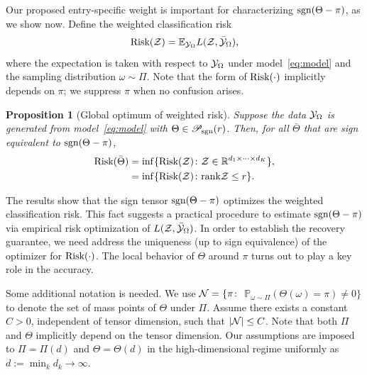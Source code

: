 \documentclass{article}
\theoremstyle{plain}
\newtheorem{prop}{Proposition}
\theoremstyle{definition}
\def\sign{\textup{sgn}}
\def\caliP{\mathscr{P}_{\textup{sgn}}}
\def\risk{\textup{Risk}}
\begin{document}
Our proposed entry-specific weight is important for characterizing $\sign(\Theta-\pi)$, as we show now. Define the weighted classification risk 
\begin{equation}\label{eq:population}
\textup{Risk}(\mathcal{Z})=\mathbb{E}_{\mathcal{Y}_\Omega}L(\mathcal{Z},\bar{\mathcal{Y}}_\Omega),
\end{equation}
where the expectation is taken with respect to $\mathcal{Y}_\Omega$ under model~\eqref{eq:model} and the sampling distribution $\omega\sim\Pi$. Note that the form of $\textup{Risk}(\cdot)$ implicitly depends on $\pi$; we suppress $\pi$ when no confusion arises. 
\begin{prop}[Global optimum of weighted risk]\label{prop:global}
Suppose the data $\mathcal{Y}_\Omega$ is generated from model~\eqref{eq:model} with $\Theta \in \caliP(r)$. Then, for all $\bar \Theta$ that are sign equivalent to $\sign(\Theta-\pi)$, 
\begin{align}\label{eq:optimal}
\textup{Risk}(\bar \Theta )&=\inf\{\textup{Risk}(\mathcal{Z})\colon \mathcal{Z}\in\mathbb{R}^{d_1\times \cdots \times d_K}\},\notag \\
&=\inf\{\textup{Risk}(\mathcal{Z})\colon \textup{rank} \mathcal{Z}\leq r\}.
\end{align}
\end{prop}
The results show that the sign tensor $\sign(\Theta-\pi)$ optimizes the weighted classification risk. This fact suggests a practical procedure to estimate $\sign(\Theta-\pi)$ via empirical risk optimization of $L(\mathcal{Z},\bar {\mathcal{Y}}_\Omega)$. In order to establish the recovery guarantee, we need address the uniqueness (up to sign equivalence) of the optimizer for $\risk(\cdot)$. %
The local behavior of $\Theta$ around $\pi$ turns out to play a key role in the accuracy. 

Some additional notation is needed. %
We use $\mathcal{N}=\{\pi\colon$  $\mathbb{P}_{\omega\sim \Pi}(\Theta(\omega)=\pi)\neq 0\}$ to denote the set of mass points of $\Theta$ under $\Pi$. Assume there exists a constant $C>0$, independent of tensor dimension, such that $|\mathcal{N}|\leq C$. Note that both $\Pi$ and $\Theta$ implicitly depend on the tensor dimension. Our assumptions are imposed to $\Pi=\Pi(d)$ and $\Theta=\Theta(d)$ in the high-dimensional regime uniformly as $d:=\min_kd_k\to\infty$. 

\end{document}
